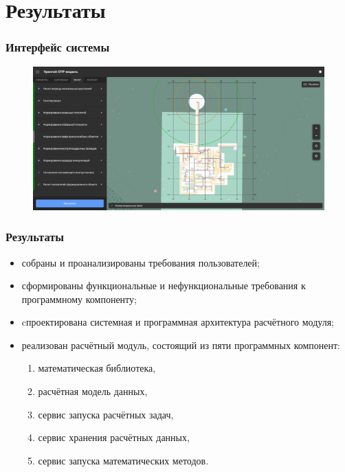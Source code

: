 \section{Результаты}

\begin{frame}
\frametitle{Интерфейс системы}
\begin{figure}
    \includegraphics[scale=0.1391]{pictures/results/plan-system}
\end{figure}
\end{frame}


\begin{frame}
\frametitle{Результаты}
\begin{itemize}
    \item собраны и проанализированы требования пользователей;
    \item сформированы функциональные и нефункциональные требования к программному компоненту;
    \item cпроектирована системная и программная архитектура расчётного модуля;
    \item {
           реализован расчётный модуль, состоящий из пяти программных компонент:
            \begin{enumerate}
                \item математическая библиотека,
                \item расчётная модель данных,
                \item сервис запуска расчётных задач,
                \item сервис хранения расчётных данных,
                \item сервис запуска математических методов.
            \end{enumerate}
    }
\end{itemize}
\end{frame}


